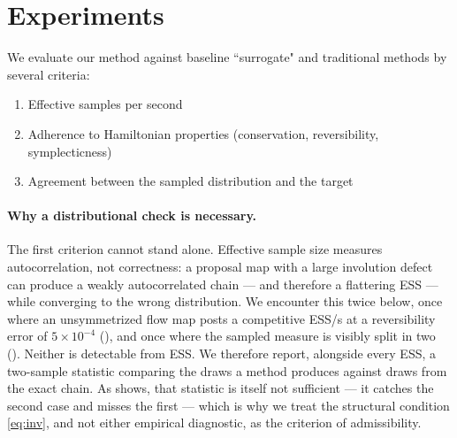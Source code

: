 \documentclass{article}
\theoremstyle{plain}
\theoremstyle{definition}
\theoremstyle{remark}
\begin{document}





\section{Experiments}

We evaluate our method against baseline ``surrogate" and traditional methods by several criteria:
\begin{enumerate}
    \item Effective samples per second
    \item Adherence to Hamiltonian properties (conservation, reversibility, symplecticness)
    \item Agreement between the sampled distribution and the target
\end{enumerate}

\paragraph{Why a distributional check is necessary.}
\label{sec:energy-distance}
The first criterion cannot stand alone. Effective sample size measures
autocorrelation, not correctness: a proposal map with a large involution
defect can produce a weakly autocorrelated chain --- and therefore a flattering
ESS --- while converging to the wrong distribution. We encounter this twice
below, once where an unsymmetrized flow map posts a competitive ESS/s at a
reversibility error of $5 \times 10^{-4}$ (), and once where the
sampled measure is visibly split in two (). Neither is
detectable from ESS. We therefore report, alongside every ESS, a two-sample
statistic comparing the draws a method produces against draws from the exact
chain. As  shows, that statistic is itself not sufficient --- it
catches the second case and misses the first --- which is why we treat the
structural condition \eqref{eq:inv}, and not either empirical diagnostic, as
the criterion of admissibility.
\end{document}
